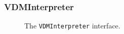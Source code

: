 \documentclass[\pformat,12pt]{article}
\begin{document}
\subsubsection{VDMInterpreter}

\begin{figure}[tbh]
\begin{center}
\mbox{}
\caption{The {\tt VDMInterpreter} interface.}\label{fig:VDMInterpreter}
\end{center}
\end{figure}

\end{document}
